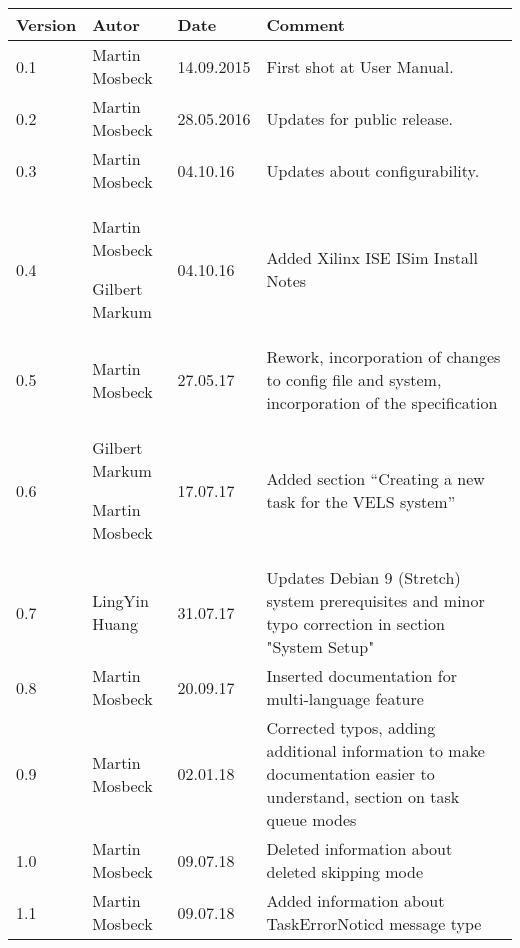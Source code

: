 
\begin{table}[h]
\begin{tabular*}{14.7cm}{|p{}|p{}|p{2cm}|p{}|}
\hline
Version & Autor & Date & Comment \\[2pt]
\hline
\hline
0.1 & Martin Mosbeck & 14.09.2015 & First shot at User Manual. \\[2pt]
\hline
0.2 & Martin Mosbeck & 28.05.2016 & Updates for public release. \\[2pt]
\hline
0.3 & Martin Mosbeck & 04.10.16 & Updates about configurability. \\[2pt]
\hline
0.4 & Martin Mosbeck \par Gilbert Markum & 04.10.16 & Added Xilinx ISE ISim Install Notes \\[2pt]
\hline
0.5 & Martin Mosbeck & 27.05.17 & Rework, incorporation of changes to config file and system, incorporation of the
specification \\[2pt]
\hline
0.6 & Gilbert Markum \par Martin Mosbeck & 17.07.17 & Added section ``Creating a new task for the VELS system'' \\[2pt]
\hline
0.7 & LingYin Huang & 31.07.17 & Updates Debian 9 (Stretch) system prerequisites and minor typo correction in section "System Setup" \\[2pt]
\hline
0.8 & Martin Mosbeck & 20.09.17 & Inserted documentation for multi-language feature \\[2pt]
\hline
0.9 & Martin Mosbeck & 02.01.18 & Corrected typos, adding additional information to make documentation easier to
understand, section on task queue modes  \\[2pt]
\hline
1.0 & Martin Mosbeck & 09.07.18 & Deleted information about deleted skipping mode \\[2pt]
\hline
1.1 & Martin Mosbeck & 09.07.18 & Added information about TaskErrorNoticd message type\\[2pt]
\hline
\end{tabular*}
\end{table}

